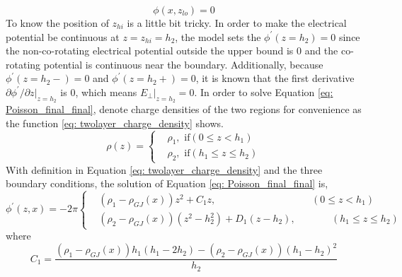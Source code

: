 \documentclass[12pt]{report}
\begin{document}
      \begin{equation}
        \label{eq: lower_boundary}
        \phi \left(x, z_{lo}\right) = 0
      \end{equation}
      To know the position of $z_{hi}$ is a little bit tricky. In order to make the electrical 
      potential be continuous at $z = z_{hi} = h_2$, the model sets the 
      $\phi^{\prime}\left(z=h_{2}\right) = 0$ since the non-co-rotating electrical potential 
      outside the upper bound is $0$ and the co-rotating potential is continuous near the 
      boundary. Additionally, because $\phi^{\prime}\left(z=h_{2}-\right) = 0$
      and $\phi^{\prime}\left(z=h_{2}+\right) = 0$, it is known that the first derivative 
      $\partial{\phi^{\prime}}/\partial{z}\vert_{z=h_{2}}$ is $0$, which means 
      $E_{\perp}\vert_{z=h_{2}} = 0$. In order to solve Equation \ref{eq: Poisson_final_final}, 
      denote charge densities of the two regions for convenience as the function 
      \ref{eq: twolayer_charge_density} shows.
      \begin{equation}
        \label{eq: twolayer_charge_density}
          \rho\left(z\right) = 
          \begin{cases}
             & \rho_{1} , \text{    if} \left(0 \leq z < h_{1}\right)\\
             & \rho_{2} , \text{    if} \left(h_{1} \leq z \leq h_{2}\right) 
          \end{cases}       
      \end{equation}
      With definition in Equation \ref{eq: twolayer_charge_density} and the three boundary 
      conditions, the solution of Equation \ref{eq: Poisson_final_final} is, 
      \begin{equation}
        \label{eq: twolayer_potential}
          \phi^{\prime}\left(z, x\right) = -2\pi
          \left\{\begin{alignedat}{2}
             & \left(\rho_{1} - \rho_{GJ}\left(x\right)\right)z^2 + C_{1} z ,  &&\left(0 \leq z < h_{1}\right)\\
             & \left(\rho_{2}-\rho_{GJ}\left(x\right)\right)\left(z^2 - h_2^2\right) + D_{1} \left(z-h_2\right),  &&\qquad \left(h_{1} \leq z \leq h_{2}\right) 
          \end{alignedat}\right.
      \end{equation}
      where 
      \begin{equation*}
        C_{1} = \frac{\left(\rho_{1}-\rho_{GJ}\left(x\right)\right)h_1\left(h_1-2h_2\right)-\left(\rho_2-\rho_{GJ}\left(x\right)\right)\left(h_1-h_2\right)^2}{h_2} 
      \end{equation*}
\end{document}
